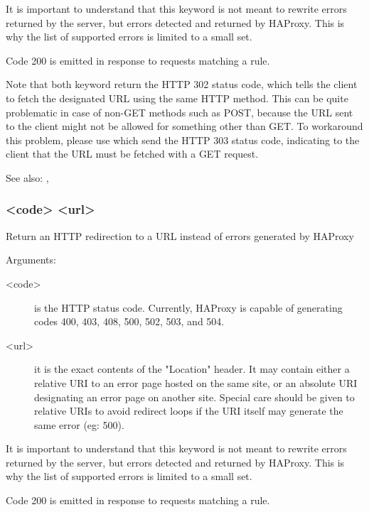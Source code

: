   It is important to understand that this keyword is not meant to rewrite
  errors returned by the server, but errors detected and returned by HAProxy.
  This is why the list of supported errors is limited to a small set.

  Code 200 is emitted in response to requests matching a  rule.

  Note that both keyword return the HTTP 302 status code, which tells the
  client to fetch the designated URL using the same HTTP method. This can be
  quite problematic in case of non-GET methods such as POST, because the URL
  sent to the client might not be allowed for something other than GET. To
  workaround this problem, please use  which send the HTTP 303
  status code, indicating to the client that the URL must be fetched with a GET
  request.


See also: , 

\subsubsection[errorloc303]{ <code> <url>}

  Return an HTTP redirection to a URL instead of errors generated by HAProxy
  
  
  Arguments:
  \begin{description}
  \item[<code>]
              is the HTTP status code. Currently, HAProxy is capable of
              generating codes 400, 403, 408, 500, 502, 503, and 504.

  \item[<url>]
              it is the exact contents of the "Location" header. It may contain
              either a relative URI to an error page hosted on the same site,
              or an absolute URI designating an error page on another site.
              Special care should be given to relative URIs to avoid redirect
              loops if the URI itself may generate the same error (eg: 500).
  \end{description}

  It is important to understand that this keyword is not meant to rewrite
  errors returned by the server, but errors detected and returned by HAProxy.
  This is why the list of supported errors is limited to a small set.

  Code 200 is emitted in response to requests matching a  rule.

